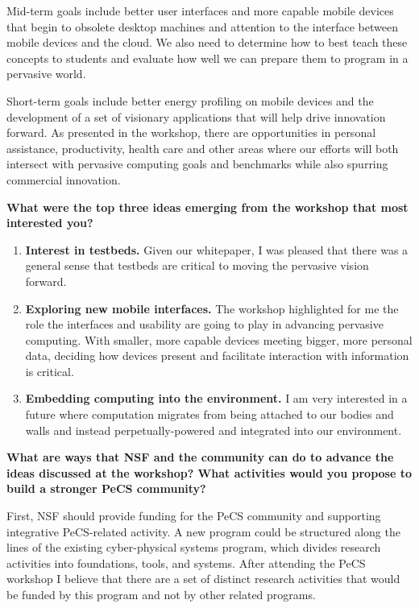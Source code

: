 \begin{flushenumbf}
Mid-term goals include better user interfaces and more capable mobile devices
that begin to obsolete desktop machines and attention to the interface
between mobile devices and the cloud. We also need to determine how to best
teach these concepts to students and evaluate how well we can prepare them to
program in a pervasive world.

Short-term goals include better energy profiling on mobile devices and the
development of a set of visionary applications that will help drive
innovation forward. As presented in the workshop, there are opportunities in
personal assistance, productivity, health care and other areas where our
efforts will both intersect with pervasive computing goals and benchmarks
while also spurring commercial innovation.

\item \textbf{What were the top three ideas emerging from the workshop that
most interested you?}

\begin{enumerate}

\item \textbf{Interest in testbeds.} Given our whitepaper, I was pleased that
there was a general sense that testbeds are critical to moving the pervasive
vision forward.

\item \textbf{Exploring new mobile interfaces.} The workshop highlighted for
me the role the interfaces and usability are going to play in advancing
pervasive computing. With smaller, more capable devices meeting bigger, more
personal data, deciding how devices present and facilitate interaction with
information is critical.

\item \textbf{Embedding computing into the environment.} I am very interested
in a future where computation migrates from being attached to our bodies and
walls and instead perpetually-powered and integrated into our environment.

\end{enumerate}

\item \textbf{What are ways that NSF and the community can do to advance the
ideas discussed at the workshop? What activities would you propose to build a
stronger PeCS community?}

First, NSF should provide funding for the PeCS community and supporting
integrative PeCS-related activity. A new program could be structured along
the lines of the existing cyber-physical systems program, which divides
research activities into foundations, tools, and systems. After attending the
PeCS workshop I believe that there are a set of distinct research activities
that would be funded by this program and not by other related programs.


\end{flushenumbf}

